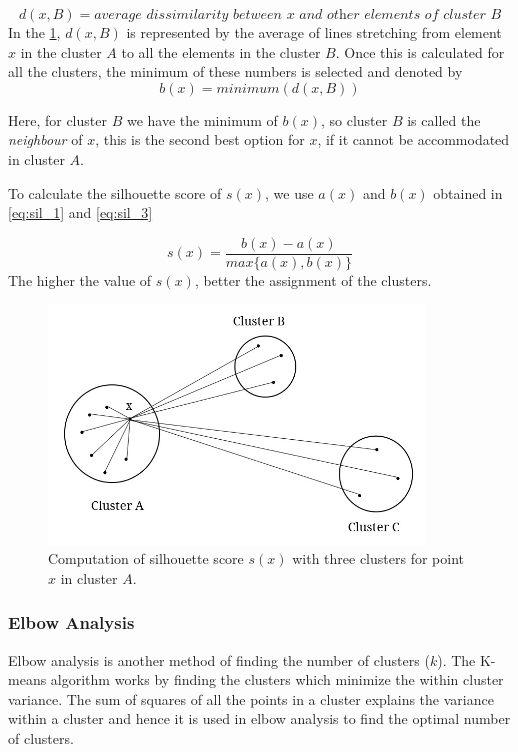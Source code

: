 \begin{equation}\label{eq:sil_2}
    d(x,B) = \textit{average dissimilarity between x and other elements of cluster B}  
\end{equation} %
In the \ref{fig:sil_score}, $d(x,B)$ is represented by the average of lines stretching from element $x$ in the  cluster $A$ to all the elements in the cluster $B$. Once this is calculated for all the clusters, the minimum of these numbers is selected and denoted by 
\begin{equation}\label{eq:sil_3}
    b(x) = minimum(d(x, B))
\end{equation}

Here, for cluster $B$ we have the minimum of $b(x)$, so cluster $B$ is called the \textit{neighbour} of $x$, this is the second best option for $x$, if it cannot be accommodated in cluster $A$.

To calculate the silhouette score of $s(x)$, we use $a(x)$ and $b(x)$ obtained in \ref{eq:sil_1} and \ref{eq:sil_3}

\begin{equation}
    s(x) = \frac{b(x)-a(x)}{max\{a(x),b(x)\}}
\end{equation}
The higher the value of $s(x)$, better the assignment of the clusters.

\begin{figure}[!ht]
    \centering
    \includegraphics[width= 10cm, keepaspectratio]{pics/sil_score.jpg}
    \captionsetup{justification=centering,margin=2cm}
    \caption{Computation of silhouette score $s(x)$ with three clusters for point $x$ in cluster $A$.}
    \label{fig:sil_score}
\end{figure}


\subsubsection{Elbow Analysis} \label{elbow}
Elbow analysis \cite{thorndike1953belongs,ketchen1996application} is another method of finding the number of clusters ($k$). The K-means algorithm works by finding the clusters which minimize the within cluster variance. The sum of squares of all the points in a cluster explains the variance within a cluster and hence it is used in elbow analysis to find the optimal number of clusters. 

